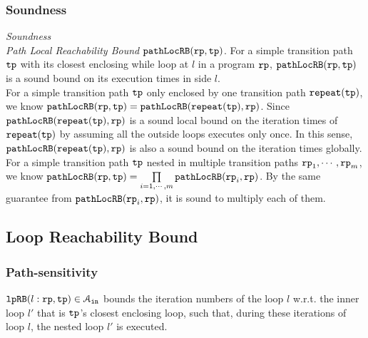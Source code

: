 \subsubsection{Soundness}
\emph{Soundness}
    \\
    \emph{Path Local Reachability Bound}  $\mathtt{pathLocRB}(\mathtt{rp}, \mathtt{tp})$.
    For a simple transition path $\mathtt{tp}$ with its closest enclosing while loop at $l$ in a program $\mathtt{rp}$, 
    $\mathtt{pathLocRB}(\mathtt{rp}, \mathtt{tp})$
    is a sound bound on its execution times in side $l$.
    \\
    For a simple transition path $\mathtt{tp}$ only enclosed by one transition path $\mathtt{repeat}(\mathtt{tp})$, 
    we know $\mathtt{pathLocRB}(\mathtt{rp}, \mathtt{tp}) = \mathtt{pathLocRB}(\mathtt{repeat}(\mathtt{tp}), \mathtt{rp})$.
    Since $\mathtt{pathLocRB}(\mathtt{repeat}(\mathtt{tp}), \mathtt{rp})$ is a sound local bound on the iteration times
    of $\mathtt{repeat}(\mathtt{tp})$ by assuming all the outside loops executes only once.
    In this sense, $\mathtt{pathLocRB}(\mathtt{repeat}(\mathtt{tp}), \mathtt{rp})$ is also a sound bound on the iteration times globally.
    \\
    For a simple transition path $\mathtt{tp}$ nested in multiple transition paths $\mathtt{rp}_1, \cdots, \mathtt{rp}_m$,
    we know $\mathtt{pathLocRB}(\mathtt{rp}, \mathtt{tp}) = \prod\limits_{i = 1, \cdots, m}\mathtt{pathLocRB}(\mathtt{rp}_i, \mathtt{rp})$.
    By the same guarantee from $\mathtt{pathLocRB}(\mathtt{rp}_i, \mathtt{rp})$, it is sound to multiply each of them.
    


\subsection{Loop Reachability Bound}
\subsubsection{Path-sensitivity}
$\mathtt{lpRB}(l: \mathtt{rp}, \mathtt{tp}) \in \mathcal{A}_{\mathtt{in}}$ bounds the iteration numbers of the loop $l$ w.r.t.
the inner loop $l'$ that is $\mathtt{tp}$'s closest enclosing loop,
such that,
during these iterations of loop $l$, the nested loop $l'$ is executed.

